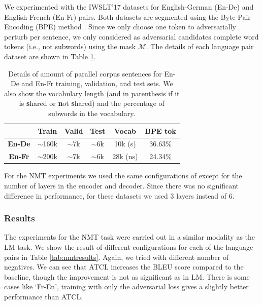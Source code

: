 \documentclass[letterpaper]{article} %
\begin{document}
We experimented with the IWSLT'17 datasets for English-German (En-De) and English-French (En-Fr) pairs. Both datasets are segmented using the Byte-Pair Encoding (BPE) method \cite{sennrich2015neural}.  Since we only choose one token to adversarially perturb per sentence, we only considered as adversarial candidates complete word tokens (i.e., not subwords) using the mask $\mathcal{M}$. The details of each language pair dataset are shown in Table \ref{tab:nmtdata}.

\begin{table}[ht]
\begin{center}
\begin{tabular}{c|ccccc}
    & \textbf{Train} & \textbf{Valid}  & \textbf{Test}   & \textbf{Vocab}      & \textbf{BPE tok} \\ \hline
    \textbf{En-De}  & $\sim$160k & $\sim$7k & $\sim$6k & 10k (s) & 36.63\% \\ 
    \textbf{En-Fr} & $\sim$200k & $\sim$7k & $\sim$6k & 28k (ns) & 24.34\% \\
    \end{tabular}
    	\centering
\caption{Details of amount of parallel corpus sentences for En-De and En-Fr training, validation, and test sets. We also show the vocabulary length (and in parenthesis if it is \textbf{s}hared or \textbf{n}ot \textbf{s}hared) and the percentage of subwords in the vocabulary.}
\label{tab:nmtdata}
\end{center}
\end{table}

For the NMT experiments we used the same configurations of \cite{vaswani2017attention} except for the number of layers in the encoder and decoder. Since there was no significant difference in performance, for these datasets we used 3 layers instead of 6.

\subsubsection{Results}
The experiments for the NMT task were carried out in a similar modality as the LM task. We show the result of different configurations for each of the language pairs in Table \ref{tab:nmtresults}. Again, we tried with different number of negatives. 
We can see that ATCL increases the BLEU score compared to the baseline, though the improvement is not as significant as in LM. There is some cases like `Fr-En', training with only the adversarial loss gives a slightly better performance than ATCL. 
\end{document}
